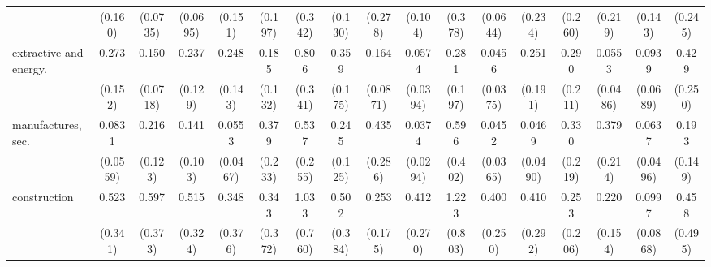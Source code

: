 {\begin{tabular}{l*{16}{c}}
                    &     (0.160)         &    (0.0735)         &    (0.0695)         &     (0.151)         &     (0.197)         &     (0.342)         &     (0.130)         &     (0.278)         &     (0.104)         &     (0.378)         &    (0.0644)         &     (0.234)         &     (0.260)         &     (0.219)         &     (0.143)         &     (0.245)         \\
[1em]
extractive and energy.&       0.273\sym{*}  &       0.150\sym{***}&       0.237\sym{**} &       0.248\sym{*}  &       0.185\sym{*}  &       0.806         &       0.359\sym{*}  &       0.164\sym{***}&      0.0574\sym{***}&       0.281         &      0.0456\sym{***}&       0.251         &       0.290         &      0.0553\sym{***}&      0.0939\sym{**} &       0.429         \\
                    &     (0.152)         &    (0.0718)         &     (0.129)         &     (0.143)         &     (0.132)         &     (0.341)         &     (0.175)         &    (0.0871)         &    (0.0394)         &     (0.197)         &    (0.0375)         &     (0.191)         &     (0.211)         &    (0.0486)         &    (0.0689)         &     (0.250)         \\
[1em]
manufactures, sec.  &      0.0831\sym{***}&       0.216\sym{**} &       0.141\sym{**} &      0.0553\sym{***}&       0.379         &       0.537         &       0.245\sym{**} &       0.435         &      0.0374\sym{***}&       0.596         &      0.0452\sym{***}&      0.0469\sym{**} &       0.330         &       0.379         &      0.0637\sym{***}&       0.193\sym{*}  \\
                    &    (0.0559)         &     (0.123)         &     (0.103)         &    (0.0467)         &     (0.233)         &     (0.255)         &     (0.125)         &     (0.286)         &    (0.0294)         &     (0.402)         &    (0.0365)         &    (0.0490)         &     (0.219)         &     (0.214)         &    (0.0496)         &     (0.149)         \\
[1em]
construction        &       0.523         &       0.597         &       0.515         &       0.348         &       0.343         &       1.033         &       0.502         &       0.253\sym{*}  &       0.412         &       1.223         &       0.400         &       0.410         &       0.253         &       0.220\sym{*}  &      0.0997\sym{**} &       0.458         \\
                    &     (0.341)         &     (0.373)         &     (0.324)         &     (0.376)         &     (0.372)         &     (0.760)         &     (0.384)         &     (0.175)         &     (0.270)         &     (0.803)         &     (0.250)         &     (0.292)         &     (0.206)         &     (0.154)         &    (0.0868)         &     (0.495)         \\

\end{tabular}}
